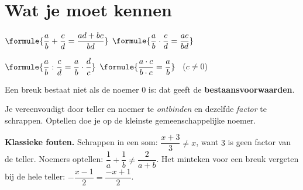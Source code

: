 %



\section{Wat je moet kennen}

\begin{theorie}
\begin{minipage}[t]{.5\linewidth}
\vspace{0pt}
$\formule{\dfrac ab + \dfrac cd = \dfrac{ad + bc}{bd}}$ \qquad $\formule{\dfrac ab \cdot \dfrac cd = \dfrac{ac}{bd}}$

\vspace{2mm}
$\formule{\dfrac ab : \dfrac cd = \dfrac ab \cdot \dfrac dc}$ \qquad $\formule{\dfrac{a \cdot c}{b \cdot c} = \dfrac ab}$ \ ($c \neq 0$)
\end{minipage}\hfill
\begin{minipage}[t]{.46\linewidth}
\vspace{0pt}
Een breuk bestaat niet als de noemer $0$ is: dat geeft de \textbf{\textcolor{accent}{bestaansvoorwaarden}}.

\vspace{1mm}
Je vereenvoudigt door teller en noemer te \emph{ontbinden} en dezelfde \emph{factor} te schrappen. Optellen doe je op de kleinste gemeenschappelijke noemer.
\end{minipage}
\end{theorie}

\textbf{Klassieke fouten.} Schrappen in een som: $\dfrac{x + 3}{3} \neq x$, want $3$ is geen factor van de teller. Noemers optellen: $\dfrac1a + \dfrac1b \neq \dfrac{2}{a + b}$. Het minteken voor een breuk vergeten bij de hele teller: $-\dfrac{x - 1}{2} = \dfrac{-x + 1}{2}$.

